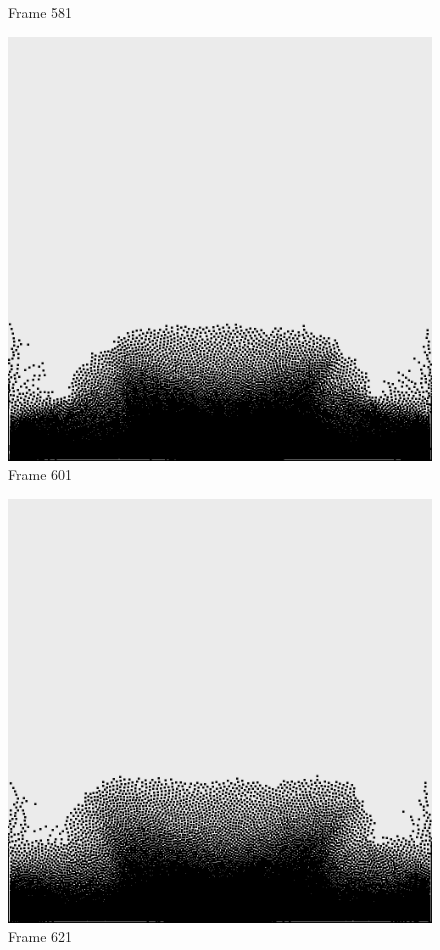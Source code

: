 \documentclass[a4paper, 12pt, oneside]{book}
\begin{document}
\begin{figure}[!ht]
\begin{center}
            Frame 581
        \end{center}
    \endminipage
    \hfill
        \begin{center}
            \includegraphics[width=\linewidth]{images/test_case_1/601.png}
            Frame 601
        \end{center}
    \endminipage
    \hfill
        \begin{center}
            \includegraphics[width=\linewidth]{images/test_case_1/621.png}
            Frame 621
        \end{center}
    \endminipage
    \hfill


\end{figure}
\end{document}
